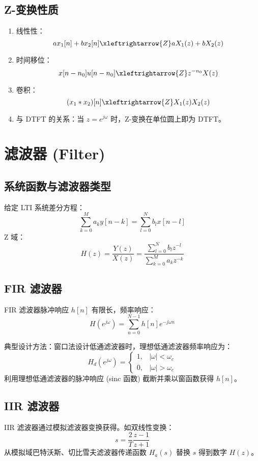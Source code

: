 \documentclass[12pt,a4paper]{article}
\begin{document}
\begin{CJK}{UTF8}{gbsn}
\subsection{Z-变换性质}
\begin{enumerate}
\item 线性性：
\[
a x_1[n] + b x_2[n] \xleftrightarrow{Z} a X_1(z) + b X_2(z)
\]

\item 时间移位：
\[
x[n-n_0]u[n-n_0] \xleftrightarrow{Z} z^{-n_0} X(z)
\]

\item 卷积：
\[
(x_1 * x_2)[n] \xleftrightarrow{Z} X_1(z)X_2(z)
\]

\item 与 DTFT 的关系：当 \(z=e^{j\omega}\) 时，Z-变换在单位圆上即为 DTFT。
\end{enumerate}

\section{滤波器 (Filter)}

\subsection{系统函数与滤波器类型}
给定 LTI 系统差分方程：
\[
\sum_{k=0}^{M} a_k y[n-k] = \sum_{l=0}^{N} b_l x[n-l]
\]
Z 域：
\[
H(z) = \frac{Y(z)}{X(z)} = \frac{\sum_{l=0}^{N} b_l z^{-l}}{\sum_{k=0}^{M} a_k z^{-k}}
\]

\subsection{FIR 滤波器}
FIR 滤波器脉冲响应 \(h[n]\) 有限长，频率响应：
\[
H(e^{j\omega}) = \sum_{n=0}^{N-1} h[n] e^{-j\omega n}
\]

典型设计方法：窗口法设计低通滤波器时，理想低通滤波器频率响应为：
\[
H_d(e^{j\omega}) =
\begin{cases}
1, & |\omega| < \omega_c \\
0, & |\omega| > \omega_c
\end{cases}
\]
利用理想低通滤波器的脉冲响应 (sinc 函数) 截断并乘以窗函数获得 \(h[n]\)。

\subsection{IIR 滤波器}
IIR 滤波器通过模拟滤波器变换获得。如双线性变换：
\[
s = \frac{2}{T}\frac{z-1}{z+1}
\]
从模拟域巴特沃斯、切比雪夫滤波器传递函数 \(H_a(s)\) 替换 \(s\) 得到数字 \(H(z)\)。


\end{CJK}
\end{document}
